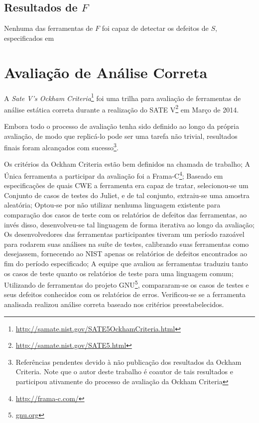 \subsection{Resultados de $F$}

Nenhuma das ferramentas de $F$ foi capaz de detectar os defeitos de $S$, especificados em 

\section{Avaliação de Análise Correta}

A \textit{Sate V's Ockham Criteria}\footnote{\url{http://samate.nist.gov/SATE5OckhamCriteria.html}} foi uma trilha para avaliação de ferramentas de análise estática correta durante a realização do SATE V\footnote{\url{http://samate.nist.gov/SATE5.html}} em Março de 2014.

Embora todo o processo de avaliação tenha sido definido ao longo da própria avaliação, de modo que replicá-lo pode ser uma tarefa não trivial, resultados finais foram alcançados com sucesso\footnote{Referências pendentes devido à não publicação dos resultados da Ockham Criteria. Note que o autor deste trabalho é coautor de tais resultados e participou ativamente do processo de avaliação da Ockham Criteria}.

Os critérios da Ockham Criteria estão bem definidos na chamada de trabalho;
A Única ferramenta a participar da avaliação foi a Frama-C\footnote{\url{http://frama-c.com/}};
Baseado em especificações de quais CWE a ferramenta era capaz de tratar, selecionou-se um Conjunto de casos de testes do Juliet, e de tal conjunto, extraiu-se uma amostra aleatória;
Optou-se por não utilizar nenhuma linguagem existente para comparação dos casos de teste com os relatórios de defeitos das ferramentas, ao invés disso, desenvolveu-se tal linguagem de forma iterativa ao longo da avaliação;
Os desenvolvedores das ferramentas participantes tiveram um período razoável para rodarem suas análises na suíte de testes, calibrando suas ferramentas como desejassem, fornecendo ao NIST apenas os relatórios de defeitos encontrados ao fim do período especificado;
A equipe que avaliou as ferramentas traduziu tanto os casos de teste quanto os relatórios de teste para uma linguagem comum;
Utilizando de ferramentas do projeto GNU\footnote{\url{gnu.org}}, compararam-se os casos de testes e seus defeitos conhecidos com os relatórios de erros.
Verificou-se se a ferramenta analisada realizou análise correta baseado nos critérios preestabelecidos.

